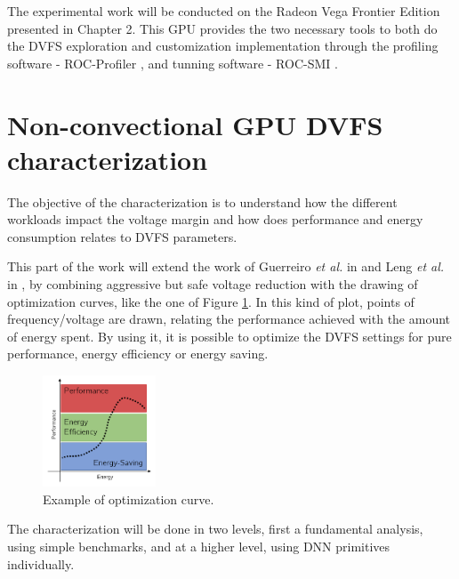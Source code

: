 The experimental work will be conducted on the Radeon Vega Frontier Edition presented in Chapter 2. This GPU provides the two necessary tools to both do the DVFS exploration and customization implementation through the profiling software - ROC-Profiler \cite{noauthor_rocm-developer-tools/rocprofiler_2019}, and tunning software - ROC-SMI \cite{noauthor_radeonopencompute/roc-smi_2019}.

\section{Non-convectional GPU DVFS characterization}

The objective of the characterization is to understand how the different workloads impact the voltage margin and how does performance and energy consumption relates to DVFS parameters. 

This part of the work will extend the work of Guerreiro \textit{et al.} in \cite{guerreiro_gpgpu_2018} \cite{guerreiro_modeling_2019} and Leng \textit{et al.} in \cite{leng_safe_2015}, by combining aggressive but safe voltage reduction with the
drawing of optimization curves, like the one of Figure \ref{fig:optcurves}. In this kind of plot, points of frequency/voltage are drawn, relating the performance achieved with the amount of energy spent. By using it, it is possible to optimize the DVFS settings for pure performance, energy efficiency or energy saving.

\begin{figure}[!htb]
  \centering
  \includegraphics[width=0.3\textwidth]{Figures/Proposel/curves.png}
  \caption[Controller]{Example of optimization curve.}
  \label{fig:optcurves}
\end{figure}

The characterization will be done in two levels, first a fundamental analysis, using simple benchmarks, and at a higher level, using DNN primitives individually.

